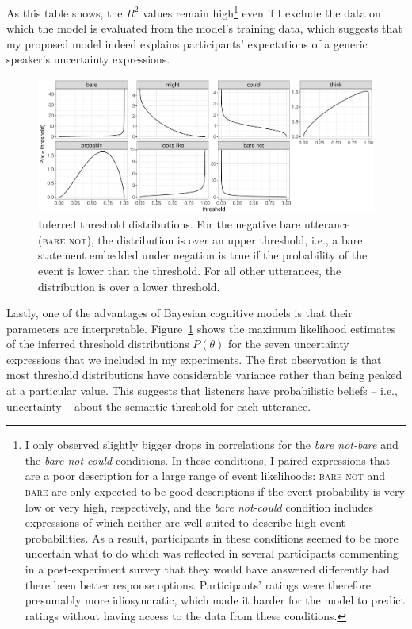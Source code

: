 As this table shows, the $R^2$ values remain high\footnote{I only observed slightly bigger drops in correlations for the \textit{bare not-bare} and the \textit{bare not-could} conditions. In these conditions, I paired expressions that are a poor description for a large range of event likelihoods: \textsc{bare not} and \textsc{bare} are only expected to be good descriptions if the event probability is very low or very high, respectively, and the \textit{bare not-could} condition includes expressions of which neither are well suited to describe high event probabilities. As a result, participants in these conditions seemed to be more uncertain what to do which was reflected in several participants commenting in a post-experiment survey that they would have answered differently had there been better response options. Participants' ratings were therefore presumably more idiosyncratic, which made it harder for the model to predict ratings without having access to the data from these conditions.} even if I exclude the data on which the model is evaluated from the model's training data, 
which suggests that my proposed model indeed explains
participants' expectations of a generic speaker's uncertainty expressions. 

\begin{figure}[th!]
\includegraphics[width=\textwidth]{plots/fig-7-threshold-distributions-prior.pdf}
\caption{Inferred threshold distributions. For the negative bare utterance (\textsc{bare not}), the distribution is over an upper threshold, i.e., a bare statement embedded under negation is true if the probability of the event is lower than the threshold. For all other utterances, the distribution is over a lower threshold.
\label{fig:threshold-distributions}}
\end{figure}

Lastly, one of the advantages of Bayesian cognitive models is that their parameters are interpretable. Figure~\ref{fig:threshold-distributions} shows the 
maximum likelihood estimates of the inferred threshold distributions $P(\theta)$ for the seven uncertainty expressions that we included in my experiments.
The first observation is that most threshold distributions have considerable variance rather than being peaked at a particular value. This suggests that
listeners have probabilistic beliefs -- i.e., uncertainty -- about the semantic threshold for each utterance.

